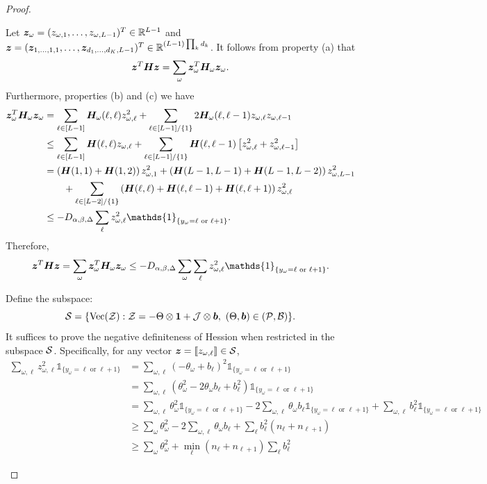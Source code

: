 \documentclass{article}
\theoremstyle{plain}
\theoremstyle{definition}
\begin{document}
\begin{proof}
\begin{enumerate}
Let $\bm{z}_\omega=(z_{\omega,1},\ldots,z_{\omega,L-1})^T\in\mathbb{R}^{L-1}$ and $\bm{z}=(\bm{z}_{1,\ldots,1,1},\ldots,\bm{z}_{d_1,\ldots,d_K,L-1})^T\in\mathbb{R}^{(L-1)\prod_k d_k}$. It follows from property (a) that
\[
\bm{z}^T\bm{H}\bm{z} =\sum_{\omega}\bm{z}_\omega^T \bm{H}_{\omega} \bm{z}_\omega.
\]
Furthermore, properties (b) and (c) we have
\begin{align}
\mz_\omega^T \mH_{\omega} \mz_\omega &=
\sum_{\ell\in[L-1]}\mH_\omega(\ell,\ell)z_{\omega,\ell}^2+\sum_{\ell\in[L-1]/\{1\}}2\mH_{\omega}(\ell,\ell-1)z_{\omega,\ell}z_{\omega,\ell-1}\\
&\leq \sum_{\ell\in[L-1]}\mH(\ell,\ell)z_{\omega,\ell}+\sum_{\ell\in[L-1]/\{1\}}\mH(\ell,\ell-1)\left[z_{\omega,\ell}^2+z_{\omega,\ell-1}^2\right]\\
&= \left(\mH(1,1)+\mH(1,2)\right)z_{\omega,1}^2+ \left(\mH(L-1,L-1)+\mH(L-1,L-2)\right)z_{\omega,L-1}^2\\&\quad\quad+\sum_{\ell\in[L-2]/\{1\}}\left(\mH(\ell,\ell)+\mH(\ell,\ell-1)+\mH(\ell,\ell+1)\right)z_{\omega,\ell}^2\\
& \leq -D_{\alpha,\beta,\Delta} \sum_{\ell}z^2_{\omega,\ell}\mathds{1}_{\{y_\omega=\ell \text{ or }\ell+1\}}.
\end{align}
Therefore,
\begin{equation}\label{eq:sum}
\mz^T\mH\mz =\sum_{\omega}\mz_\omega^T \mH_{\omega} \mz_\omega \leq -D_{\alpha,\beta,\Delta}\sum_{\omega}\sum_{\ell} z^2_{\omega,\ell}\mathds{1}_{\{y_\omega=\ell \text{ or }\ell+1\}}.
\end{equation}


Define the subspace:
\[
\tS=\{\Vec(\tZ): \tZ=-\Theta\otimes \mathbf{1}+\tJ\otimes \mb,\ (\Theta,\mb)\in(\tP,\tB)\}.
\]
It suffices to prove the negative definiteness of Hession when restricted in the subspace $\mathcal{S}$. Specifically, for any vector $\bm{z}=\llbracket z_{\omega,\ell} \rrbracket\in\mathcal{S}$,
\begin{align}
\sum_{\omega,\ell} z^2_{\omega,\ell}\mathds{1}_{\{y_\omega=\ell \text{ or }\ell+1\}}&=\sum_{\omega,\ell}(-\theta_\omega+b_\ell)^2\mathds{1}_{\{y_\omega=\ell \text{ or }\ell+1\}}\\
&=\sum_{\omega,\ell}(\theta^2_\omega-2\theta_\omega b_\ell + b^2_\ell)\mathds{1}_{\{y_\omega=\ell \text{ or }\ell+1\}}\\
&=\sum_{\omega,\ell}\theta^2_\omega\mathds{1}_{\{y_\omega=\ell \text{ or }\ell+1\}}-2\sum_{\omega,\ell} \theta_\omega b_\ell \mathds{1}_{\{y_\omega=\ell \text{ or }\ell+1\}}+\sum_{\omega,\ell}b^2_\ell\mathds{1}_{\{y_\omega=\ell \text{ or }\ell+1\}}\\
&\geq \sum_{\omega}\theta^2_\omega -2\sum_{\omega,\ell}\theta_\omega b_\ell+\sum_{\ell}b_\ell^2\left(n_{\ell}+n_{\ell+1}\right)\\
&\geq \sum_{\omega}\theta^2_\omega+\min_\ell\left(n_{\ell}+n_{\ell+1}\right)\sum_{\ell}b_\ell^2
\end{align}


\end{enumerate}
\end{proof}
\end{document}
